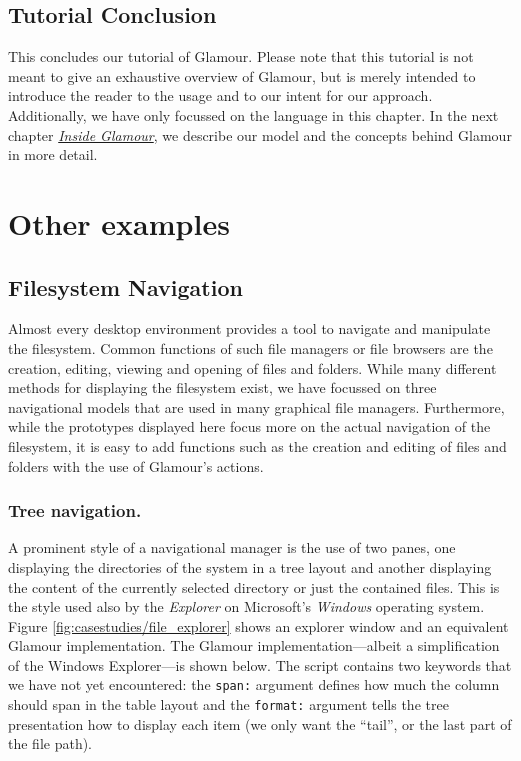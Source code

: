 \documentclass[a4paper,10pt,twoside]{book}
\begin{document}
\subsection{Tutorial Conclusion}

This concludes our tutorial of Glamour. Please note that this tutorial
is not meant to give an exhaustive overview of Glamour, but is merely
intended to introduce the reader to the usage and to our intent for
our approach. Additionally, we have only focussed on the language in
this chapter. In the next chapter \hyperref[chp:design]{\emph{Inside
    Glamour}}, we describe our model and the concepts behind Glamour
in more detail.



\section{Other examples}

\subsection{Filesystem Navigation}

Almost every desktop environment provides a tool to navigate and
manipulate the filesystem. Common functions of such file managers or
file browsers are the creation, editing, viewing and opening of files
and folders. While many different methods for displaying the
filesystem exist, we have focussed on three navigational models that
are used in many graphical file managers. Furthermore, while the
prototypes displayed here focus more on the actual navigation of the
filesystem, it is easy to add functions such as the creation and
editing of files and folders with the use of Glamour's actions.


\subsubsection{Tree navigation.} A prominent style of a navigational
manager is the use of two panes, one displaying the directories of the
system in a tree layout and another displaying the content of the
currently selected directory or just the contained files. This is the
style used also by the \emph{Explorer} on Microsoft's \emph{Windows}
operating system. Figure \ref{fig:casestudies/file_explorer} shows an
explorer window and an equivalent Glamour implementation. The Glamour
implementation---albeit a simplification of the Windows Explorer---is
shown below. The script contains two keywords that we have not yet
encountered: the \texttt{span:} argument defines how much the column
should span in the table layout and the \texttt{format:} argument
tells the tree presentation how to display each item (we only want the
``tail'', or the last part of the file path).
\end{document}
